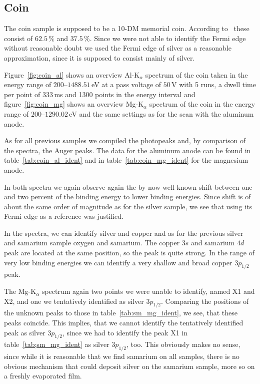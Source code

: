 \documentclass[a4paper,10pt]{scrartcl}
\begin{document}
\subsection{Coin}

The coin sample is supposed to be a 10-DM memorial coin. According to~\cite{bank} these consist of $62.5\,\%$ and $37.5\,\%$. Since we were not able to identify the Fermi edge without reasonable doubt we used the Fermi edge of silver as a reasonable approximation, since it is supposed to consist mainly of silver.

Figure~\ref{fig:coin_al} shows an overview Al-K$_{\alpha}$ spectrum of the coin taken in the energy range of $200$--$1488.51\,$eV at a pass voltage of $50\,$V with 5 runs, a dwell time per point of $333\,$ms and 1300 points in the energy interval and figure~\ref{fig:coin_mg} shows an overview Mg-K$_{\alpha}$ spectrum of the coin in the energy range of $200$--$1290.02\,$eV and the same settings as for the scan with the aluminum anode.

As for all previous samples we compiled the photopeaks and, by comparison of the spectra, the Auger peaks. The data for the aluminum anode can be found in table~\ref{tab:coin_al_ident} and in table~\ref{tab:coin_mg_ident} for the magnesium anode.

In both spectra we again observe again the by now well-known shift between one and two percent of the binding energy to lower binding energies. Since shift is of about the same order of magnitude as for the silver sample, we see that using its Fermi edge as a reference was justified. 

In the spectra, we can identify silver and copper and as for the previous silver and samarium sample oxygen and samarium. The copper $3s$ and samarium $4d$ peak are located at the same position, so the peak is quite strong. In the range of very low binding energies  we can identify a very shallow and broad copper $3p_{1/2}$ peak.

The Mg-K$_{\alpha}$ spectrum again two points we were unable to identify, named X1 and X2, and one we tentatively identified as silver $3p_{1/2}$. Comparing the positions of the unknown peaks to those in table~\ref{tab:sm_mg_ident}, we see, that these peaks coincide. This implies, that we cannot identify the tentatively identified peak as silver $3p_{1/2}$, since we had to identify the peak X1 in table~\ref{tab;sm_mg_ident} as silver $3p_{1/2}$, too. This obviously makes no sense, since while it is reasonable that we find samarium on all samples, there is no obvious mechanism that could deposit silver on the samarium sample, more so on a freshly evaporated film.
\end{document}
